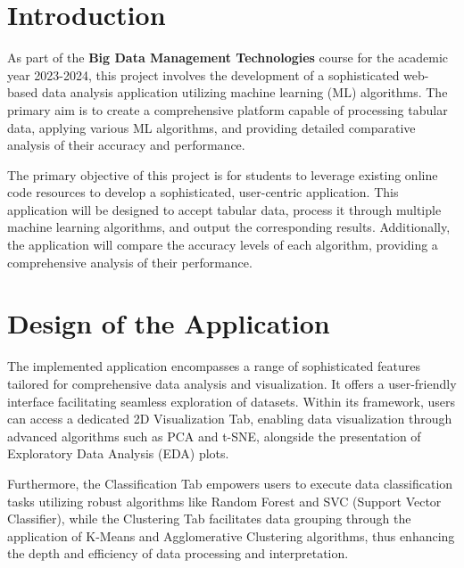 \documentclass[unnumsec,webpdf,contemporary,large]{oup-authoring-template}%
\theoremstyle{thmstyleone}%
\theoremstyle{thmstyletwo}%
\theoremstyle{thmstylethree}%
\begin{document}

\maketitle


\section{Introduction}
 As part of the \textbf{Big Data Management Technologies} course for the academic year 2023-2024, this project involves the development of a sophisticated web-based data analysis application utilizing machine learning (ML) algorithms. The primary aim is to create a comprehensive platform capable of processing tabular data, applying various ML algorithms, and providing detailed comparative analysis of their accuracy and performance. 
\vspace{0.3cm}

The primary objective of this project is for students to leverage existing online code resources to develop a sophisticated, user-centric application. This application will be designed to accept tabular data, process it through multiple machine learning algorithms, and output the corresponding results. Additionally, the application will compare the accuracy levels of each algorithm, providing a comprehensive analysis of their performance.


\section{Design of the Application}\label{sec2}

The implemented application encompasses a range of sophisticated features tailored for comprehensive data analysis and visualization. It offers a user-friendly interface facilitating seamless exploration of datasets. Within its framework, users can access a dedicated 2D Visualization Tab, enabling data visualization through advanced algorithms such as PCA and t-SNE, alongside the presentation of Exploratory Data Analysis (EDA) plots. 
\vspace{0.3cm}

Furthermore, the Classification Tab empowers users to execute data classification tasks utilizing robust algorithms like Random Forest and SVC (Support Vector Classifier), while the Clustering Tab facilitates data grouping through the application of K-Means and Agglomerative Clustering algorithms, thus enhancing the depth and efficiency of data processing and interpretation.
\end{document}
